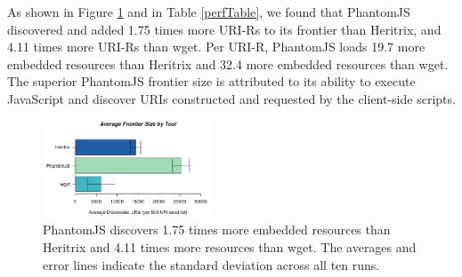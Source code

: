 \documentclass{ipres_proc_article-sp}
\begin{document}
As shown in Figure \ref{frontiersize} and in Table \ref{perfTable}, we found that PhantomJS discovered and added 
1.75 times more URI-Rs to its frontier than Heritrix, and 4.11 times more URI-Rs than wget. Per URI-R, PhantomJS loads 19.7 more embedded resources than Heritrix and 32.4 more embedded resources than wget. The superior PhantomJS frontier size is attributed to its ability to execute JavaScript and discover URIs constructed and requested by the client-side scripts.

\begin{figure}
  \begin{center}
    \includegraphics[width=0.45\textwidth]{./imgs/sizeBarStats.png}
  \end{center}
  \caption{PhantomJS discovers 1.75 times more embedded resources than Heritrix and 4.11 times more resources than wget. The averages and error lines indicate the standard deviation across all ten runs.}
  \label{frontiersize}
\end{figure}


\end{document}
